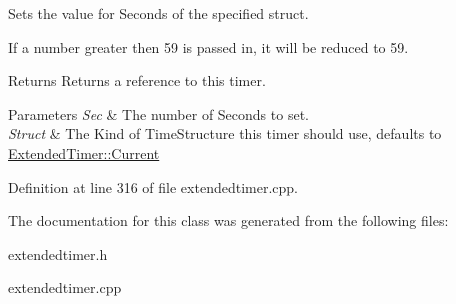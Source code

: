 Sets the value for Seconds of the specified struct. 

If a number greater then 59 is passed in, it will be reduced to 59. \begin{DoxyReturn}{Returns}
Returns a reference to this timer. 
\end{DoxyReturn}

\begin{DoxyParams}{Parameters}
{\em Sec} & The number of Seconds to set. \\
\hline
{\em Struct} & The Kind of TimeStructure this timer should use, defaults to \hyperlink{classMezzanine_1_1ExtendedTimer_a52119e2da54ea7ae5da0dc1f921a3b61ab66b80ae57d622d3555bdd2828b5dfff}{ExtendedTimer::Current} \\
\hline
\end{DoxyParams}


Definition at line 316 of file extendedtimer.cpp.



The documentation for this class was generated from the following files:\begin{DoxyCompactItemize}
\item 
extendedtimer.h\item 
extendedtimer.cpp\end{DoxyCompactItemize}
